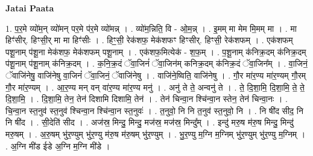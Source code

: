 \documentclass[17pt]{extarticle}
\begin{document}
\textbf{Jatai Paata} \newline

1. प॒र॒मे व्यो॑म॒न् व्यो॑मन् पर॒मे प॑र॒मे व्यो॑मन्न् । . व्यो॑म॒न्निति॒ वि - ओ॒म॒न्न् । . इ॒मम् मा मेम मि॒मम् मा । . मा हिꣳ॑सीर्. हिꣳसी॒र् मा मा हिꣳ॑सीः । . हिꣳ॒॒सी॒ रेक॑शफ॒ मेक॑शफꣳ हिꣳसीर्. हिꣳसी॒ रेक॑शफम् । . एक॑शफम् पशू॒नाम् प॑शू॒ना मेक॑शफ॒ मेक॑शफम् पशू॒नाम् । . एक॑शफ॒मित्येक॑ - श॒फ॒म् । . प॒शू॒नाम् क॑निक्र॒दम् क॑निक्र॒दम् प॑शू॒नाम् प॑शू॒नाम् क॑निक्र॒दम् । . क॒नि॒क्र॒दं ॅवा॒जिनं॑ ॅवा॒जिन॑म् कनिक्र॒दम् क॑निक्र॒दं ॅवा॒जिन᳚म् । . वा॒जिनं॒ ॅवाजि॑नेषु॒ वाजि॑नेषु वा॒जिनं॑ ॅवा॒जिनं॒ ॅवाजि॑नेषु । . वाजि॑ने॒ष्विति॒ वाजि॑नेषु । . गौ॒र मा॑र॒ण्य मा॑र॒ण्यम् गौ॒रम् गौ॒र मा॑र॒ण्यम् । . आ॒र॒ण्य मन् वन् वा॑र॒ण्य मा॑र॒ण्य मनु॑ । . अनु॑ ते ते॒ अन्वनु॑ ते । . ते॒ दि॒शा॒मि॒ दि॒शा॒मि॒ ते॒ ते॒ दि॒शा॒मि॒ । . दि॒शा॒मि॒ तेन॒ तेन॑ दिशामि दिशामि॒ तेन॑ । . तेन॑ चिन्वा॒न श्चि॑न्वा॒न स्तेन॒ तेन॑ चिन्वा॒नः । . चि॒न्वा॒न स्त॒नुव॑ स्त॒नुव॑ श्चिन्वा॒न श्चि॑न्वा॒न स्त॒नुवः॑ । . त॒नुवो॒ नि नि त॒नुव॑ स्त॒नुवो॒ नि । . नि षी॑द सीद॒ नि नि षी॑द । . सी॒देति॑ सीद । . अज॑स्र॒ मिन्दु॒ मिन्दु॒ मज॑स्र॒ मज॑स्र॒ मिन्दु᳚म् । . इन्दु॑ मरु॒ष म॑रु॒ष मिन्दु॒ मिन्दु॑ मरु॒षम् । . अ॒रु॒षम् भु॑र॒ण्युम् भु॑र॒ण्यु म॑रु॒ष म॑रु॒षम् भु॑र॒ण्युम् । . भु॒र॒ण्यु म॒ग्नि म॒ग्निम् भु॑र॒ण्युम् भु॑र॒ण्यु म॒ग्निम् । . अ॒ग्नि मी॑ड ईडे अ॒ग्नि म॒ग्नि मी॑डे । \newline
\end{document}
